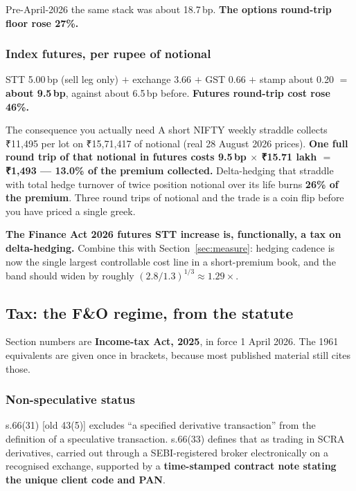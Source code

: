 \documentclass[11pt,a4paper]{article}
\newcommand{\rs}{₹}
\begin{document}
Pre-April-2026 the same stack was about 18.7\,bp. \textbf{The options round-trip
floor rose 27\%.}

\subsubsection{Index futures, per rupee of notional}

STT 5.00\,bp (sell leg only) $+$ exchange 3.66 $+$ GST 0.66 $+$ stamp about 0.20
$=$ \textbf{about 9.5\,bp}, against about 6.5\,bp before. \textbf{Futures
round-trip cost rose 46\%.}

\begin{keyfact}{The consequence you actually need}
A short NIFTY weekly straddle collects \rs 11{,}495 per lot on \rs 15{,}71{,}417
of notional (real 28 August 2026 prices). \textbf{One full round trip of that
notional in futures costs 9.5\,bp $\times$ \rs 15.71 lakh $=$ \rs 1{,}493 ---
13.0\% of the premium collected.} Delta-hedging that straddle with total hedge
turnover of twice position notional over its life burns \textbf{26\% of the
premium}. Three round trips of notional and the trade is a coin flip before you
have priced a single greek.

\textbf{The Finance Act 2026 futures STT increase is, functionally, a tax on
delta-hedging.} Combine this with Section~\ref{sec:measure}: hedging cadence is
now the single largest controllable cost line in a short-premium book, and the
band should widen by roughly $(2.8/1.3)^{1/3} \approx 1.29\times$.
\end{keyfact}

\subsection{Tax: the F\&O regime, from the statute}

Section numbers are \textbf{Income-tax Act, 2025}, in force 1 April 2026. The 1961
equivalents are given once in brackets, because most published material still
cites those.

\subsubsection{Non-speculative status}

s.66(31) [old 43(5)] excludes ``a specified derivative transaction'' from the
definition of a speculative transaction. s.66(33) defines that as trading in SCRA
derivatives, carried out through a SEBI-registered broker electronically on a
recognised exchange, supported by a \textbf{time-stamped contract note stating the
unique client code and PAN}.
\end{document}
